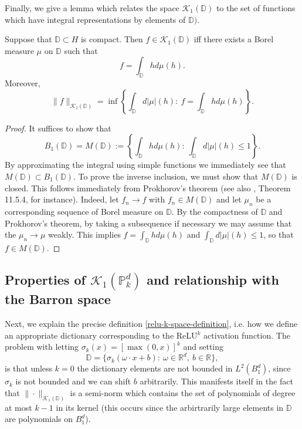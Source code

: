 Finally, we give a lemma which relates the space $\mathcal{K}_1(\mathbb{D})$ to the set of functions which have integral representations by elements of $\mathbb{D})$.
\begin{lemma}\label{prokhorov-lemma}
 Suppose that $\mathbb{D}\subset H$ is compact. Then $f\in \mathcal{K}_1(\mathbb{D})$ iff there exists a Borel measure $\mu$ on $\mathbb{D}$ such that
 \begin{equation}
  f = \int_\mathbb{D} hd\mu(h).
 \end{equation}
 Moreover,
 \begin{equation}
  \|f\|_{\mathcal{K}_1(\mathbb{D})} = \inf\left\{\int_\mathbb{D} d|\mu|(h):~f = \int_\mathbb{D} hd\mu(h)\right\}.
 \end{equation}

\end{lemma}
\begin{proof}
 It suffices to show that 
 $$B_1(\mathbb{D}) = M(\mathbb{D}):=\left\{\int_\mathbb{D} hd\mu(h):~\int_\mathbb{D} d|\mu|(h) \leq 1\right\}.$$
 By approximating the integral using simple functions we immediately see that $M(\mathbb{D})\subset B_1(\mathbb{D})$. To prove the inverse inclusion, we must show that $M(\mathbb{D})$ is closed. This follows immediately from Prokhorov's theorem \cite{prokhorov1956convergence} (see also \cite{dudley2018real}, Theorem 11.5.4, for instance). Indeed, let $f_n\rightarrow f$ with $f_n\in M(\mathbb{D})$ and let $\mu_n$ be a corresponding sequence of Borel measure on $\mathbb{D}$. By the compactness of $\mathbb{D}$ and Prokhorov's theorem, by taking a subsequence if necessary we may assume that the $\mu_n\rightarrow \mu$ weakly. This implies $f = \int_\mathbb{D} hd\mu(h)$ and $\int_\mathbb{D} d|\mu|(h) \leq 1$, so that $f\in M(\mathbb{D})$.
\end{proof}


\subsection{Properties of $\mathcal{K}_1(\mathbb{P}^d_k)$ and relationship with the Barron space}
Next, we explain the precise definition \eqref{relu-k-space-definition}, i.e. how we define an appropriate dictionary corresponding to the ReLU$^k$ activation function. The problem with letting $\sigma_k(x) = [\max(0,x)]^k$ and setting
\begin{equation}
 \mathbb{D} = \{\sigma_k(\omega\cdot x + b):~\omega\in \mathbb{R}^d,~b\in \mathbb{R}\},
\end{equation}
is that unless $k=0$ the dictionary elements are not bounded in $L^2(B_1^d)$, since $\sigma_k$ is not bounded and we can shift $b$ arbitrarily. This manifests itself in the fact that $\|\cdot\|_{\mathcal{K}_1(\mathbb{D})}$ is a semi-norm which contains the set of polynomials of degree at most $k-1$ in its kernel (this occurs since the arbirtrarily large elements in $\mathbb{D}$ are polynomials on $B_1^d$).


